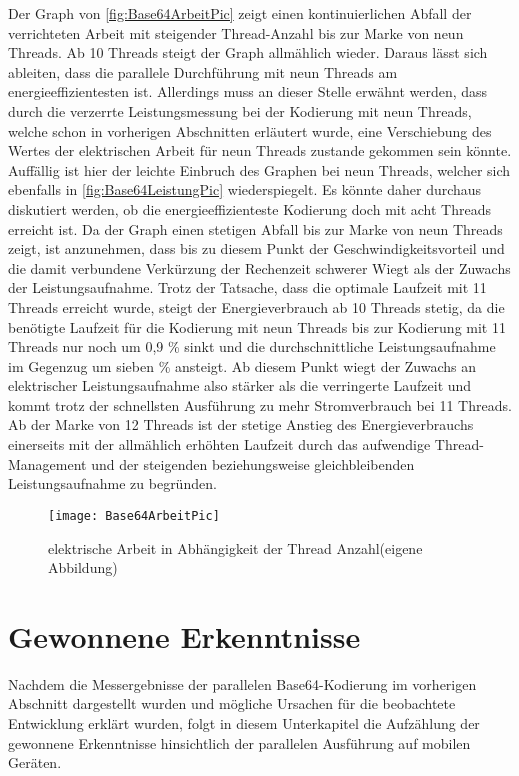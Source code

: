 Der Graph von \autoref{fig:Base64ArbeitPic} zeigt einen kontinuierlichen Abfall der verrichteten Arbeit mit steigender Thread-Anzahl bis zur Marke von neun Threads. Ab 10 Threads steigt der Graph allmählich wieder. Daraus lässt sich ableiten, dass die parallele Durchführung mit neun Threads am energieeffizientesten ist. Allerdings muss an dieser Stelle erwähnt werden, dass durch die verzerrte Leistungsmessung bei der Kodierung mit neun Threads, welche schon in vorherigen Abschnitten erläutert wurde, eine Verschiebung des Wertes der elektrischen Arbeit für neun Threads zustande gekommen sein könnte. Auffällig ist hier der leichte Einbruch des Graphen bei neun Threads, welcher sich ebenfalls in \autoref{fig:Base64LeistungPic} wiederspiegelt. Es könnte daher durchaus diskutiert werden, ob die energieeffizienteste Kodierung doch mit acht Threads erreicht ist. Da der Graph einen stetigen Abfall bis zur Marke von neun Threads zeigt, ist anzunehmen, dass bis zu diesem Punkt der Geschwindigkeitsvorteil und die damit verbundene Verkürzung der Rechenzeit schwerer Wiegt als der Zuwachs der Leistungsaufnahme. Trotz der Tatsache, dass die optimale Laufzeit mit 11 Threads erreicht wurde, steigt der Energieverbrauch ab 10 Threads stetig, da die benötigte Laufzeit für die Kodierung mit neun Threads bis zur Kodierung mit 11 Threads nur noch um 0,9 \% sinkt und die durchschnittliche Leistungsaufnahme im Gegenzug um sieben \% ansteigt. Ab diesem Punkt wiegt der Zuwachs an elektrischer Leistungsaufnahme also stärker als die verringerte Laufzeit und kommt trotz der schnellsten Ausführung zu mehr Stromverbrauch bei 11 Threads. Ab der Marke von 12 Threads ist der stetige Anstieg des Energieverbrauchs einerseits mit der allmählich erhöhten Laufzeit durch das aufwendige Thread-Management und der steigenden beziehungsweise gleichbleibenden Leistungsaufnahme zu begründen.

\begin{figure}[H]
	\begin{center}	 
	\texttt{[image: Base64ArbeitPic]}
	\caption{elektrische Arbeit in Abhängigkeit der Thread Anzahl(eigene Abbildung)}
	\label{fig:Base64ArbeitPic} 
	\end{center}
\end{figure}

\section{Gewonnene Erkenntnisse}

Nachdem die Messergebnisse der parallelen Base64-Kodierung im vorherigen Abschnitt dargestellt wurden und mögliche Ursachen für die beobachtete Entwicklung erklärt wurden, folgt in diesem Unterkapitel die Aufzählung der gewonnene Erkenntnisse hinsichtlich der parallelen Ausführung auf mobilen Geräten.

